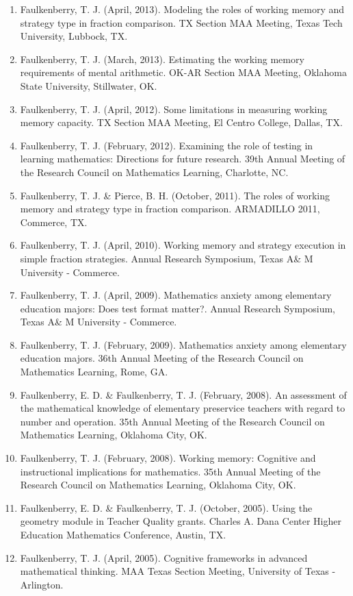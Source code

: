\documentclass[article,10pt]{article}
\begin{document}
\begin{enumerate}
\item Faulkenberry, T. J. (April, 2013). Modeling the roles of working memory and strategy type in fraction comparison. TX Section MAA Meeting, Texas Tech University, Lubbock, TX.
\item Faulkenberry, T. J. (March, 2013). Estimating the working memory requirements of mental arithmetic. OK-AR Section MAA Meeting, Oklahoma State University, Stillwater, OK.
\item Faulkenberry, T. J. (April, 2012). Some limitations in measuring working memory capacity. TX Section MAA Meeting, El Centro College, Dallas, TX.
\item Faulkenberry, T. J. (February, 2012). Examining the role of testing in learning mathematics: Directions for future research. 39th Annual Meeting of the Research Council on Mathematics Learning, Charlotte, NC.
\item Faulkenberry, T. J. \& Pierce, B. H. (October, 2011). The roles of working memory and strategy type in fraction comparison. ARMADILLO 2011, Commerce, TX.
\item Faulkenberry, T. J. (April, 2010). Working memory and strategy execution in simple fraction strategies. Annual Research Symposium, Texas A\& M University - Commerce.
\item Faulkenberry, T. J. (April, 2009). Mathematics anxiety among elementary education majors: Does test format matter?. Annual Research Symposium, Texas A\& M University - Commerce.
\item Faulkenberry, T. J. (February, 2009). Mathematics anxiety among elementary education majors. 36th Annual Meeting of the Research Council on Mathematics Learning, Rome, GA.
\item Faulkenberry, E. D. \& Faulkenberry, T. J. (February, 2008). An assessment of the mathematical knowledge of elementary preservice teachers with regard to number and operation. 35th Annual Meeting of the Research Council on Mathematics Learning, Oklahoma City, OK.
\item Faulkenberry, T. J. (February, 2008). Working memory: Cognitive and instructional implications for mathematics. 35th Annual Meeting of the Research Council on Mathematics Learning, Oklahoma City, OK.
\item Faulkenberry, E. D. \& Faulkenberry, T. J. (October, 2005). Using the geometry module in Teacher Quality grants. Charles A. Dana Center Higher Education Mathematics Conference, Austin, TX.
\item Faulkenberry, T. J. (April, 2005). Cognitive frameworks in advanced mathematical thinking. MAA Texas Section Meeting, University of Texas - Arlington.

\end{enumerate}
\end{document}
